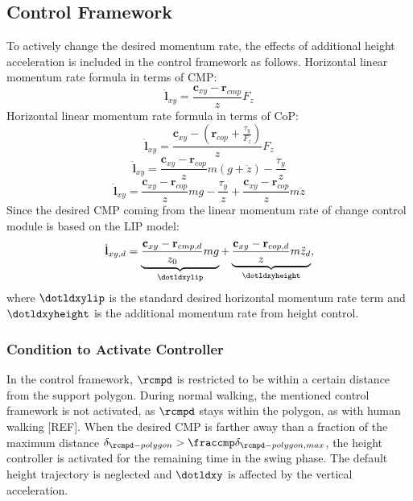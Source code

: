 \subsection{Control Framework}
To actively change the desired momentum rate, the effects of additional height acceleration is included in the control framework as follows. 
Horizontal linear momentum rate formula in terms of \ac{CMP}:
\begin{equation}
\dot{\mathbf{l}}_{xy}=\frac{\mathbf{c}_{xy}-\mathbf{r}_{cmp}}{z}F_z
\end{equation}
Horizontal linear momentum rate formula in terms of \ac{CoP}:
\begin{equation}
\dot{\mathbf{l}}_{xy}=\frac{\mathbf{c}_{xy}-(\mathbf{r}_{cop}+\frac{\tau_y}{F_z})}{z}F_z
\end{equation}
\begin{equation}
\dot{\mathbf{l}}_{xy}=\frac{\mathbf{c}_{xy}-\mathbf{r}_{cop}}{z}m(g+\ddot{z}) - \frac{\tau_y}{z}
\end{equation}
\begin{equation}
\dot{\mathbf{l}}_{xy}=\frac{\mathbf{c}_{xy}-\mathbf{r}_{cop}}{z}mg - \frac{\tau_y}{z} + \frac{\mathbf{c}_{xy}-\mathbf{r}_{cop}}{z}m\ddot{z}
\end{equation}
 Since the desired \ac{CMP} coming from the linear momentum rate of change control module is based on the \ac{LIP} model:
 \begin{equation}
\dot{\mathbf{l}}_{xy,d}=\underbrace{ \frac{\mathbf{c}_{xy}-\mathbf{r}_{cmp,d}} {z_0}mg}_{\dotldxylip}  + \underbrace{\frac{\mathbf{c}_{xy}-\mathbf{r}_{cop,d}}{z}m\ddot{z}_d}_{\dotldxyheight},
\end{equation}
where $\dotldxylip$ is the standard desired horizontal momentum rate term and $\dotldxyheight$ is the additional momentum rate from height control.
\subsubsection{Condition to Activate Controller}
In the control framework, $\rcmpd$ is restricted to be within a certain distance from the support polygon. During normal walking, the mentioned control framework is not activated, as $\rcmpd$ stays within the polygon, as with human walking [REF]. When the desired \ac{CMP} is farther away than a fraction of the maximum distance $\delta_{\rcmpd-polygon}>\fraccmp\delta_{\rcmpd-polygon,max}$, the height controller is activated for the remaining time in the swing phase. The default height trajectory is neglected and $\dotldxy$ is affected by the vertical acceleration.

